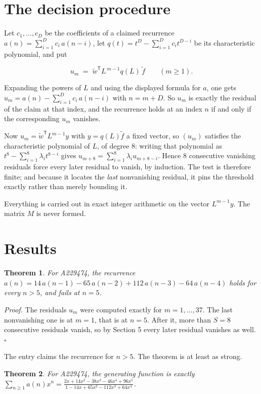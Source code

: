 \documentclass[11pt]{article}
\newtheorem{theorem}{Theorem}
\theoremstyle{definition}
\begin{document}
\section{The decision procedure}

Let $c_1,\dots,c_D$ be the coefficients of a claimed recurrence $a(n) = \sum_{i=1}^{D} c_i\,a(n-i)$, let $q(t) = t^{D} - \sum_{i=1}^{D} c_i t^{D-i}$ be its characteristic polynomial, and put

\[u_m \;=\; \tilde w^{\mathsf T} L^{\,m-1} q(L)\,\tilde f \qquad (m \ge 1).\]

Expanding the powers of $L$ and using the displayed formula for $a$, one gets $u_m = a(n) - \sum_{i=1}^{D} c_i\,a(n-i)$ with $n = m + D$. So $u_m$ is exactly the residual of the claim at that index, and the recurrence holds at an index $n$ if and only if the corresponding $u_m$ vanishes.

Now $u_m = \tilde w^{\mathsf T} L^{m-1} y$ with $y = q(L)\tilde f$ a fixed vector, so $(u_m)$ satisfies the characteristic polynomial of $L$, of degree $8$: writing that polynomial as $t^{8} - \sum_{i=1}^{8} \lambda_i t^{8-i}$ gives $u_{m+8} = \sum_{i=1}^{8} \lambda_i u_{m+8-i}$. Hence $8$ consecutive vanishing residuals force every later residual to vanish, by induction. The test is therefore finite; and because it locates the {\itshape last} nonvanishing residual, it pins the threshold exactly rather than merely bounding it.

Everything is carried out in exact integer arithmetic on the vector $L^{m-1}y$. The matrix $M$ is never formed.

\section{Results}

\begin{theorem} For A229474, the recurrence $a(n) = 14\,a(n-1) - 65\,a(n-2) + 112\,a(n-3) - 64\,a(n-4)$ holds for every $n > 5$, and fails at $n = 5$.\end{theorem}

{\itshape Proof.} The residuals $u_m$ were computed exactly for $m = 1,\dots,37$. The last nonvanishing one is at $m = 1$, that is at $n = 5$. After it, more than $S = 8$ consecutive residuals vanish, so by Section 5 every later residual vanishes as well. $\square$

The entry claims the recurrence for $n > 5$. The theorem is at least as strong.

\begin{theorem} For A229474, the generating function is exactly $\sum_{n\ge 1} a(n)x^n = \frac{2x + 14x^{2} - 38x^{3} - 46x^{4} + 96x^{5}}{1 - 14x + 65x^{2} - 112x^{3} + 64x^{4}}$.\end{theorem}
\end{document}
